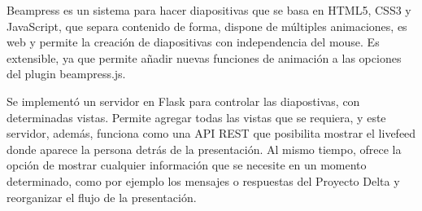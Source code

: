 
\begin{conclusions}

	Beampress es un sistema para hacer diapositivas que se basa en HTML5, CSS3 y JavaScript, que separa contenido de forma, dispone de múltiples animaciones, es web y permite la creación de diapositivas con independencia del mouse. Es extensible, ya que permite añadir nuevas funciones de animación a las opciones del plugin beampress.js.

	Se implementó un servidor en Flask para controlar las diapostivas, con determinadas vistas. Permite agregar todas las vistas que se requiera, y este servidor, además, funciona como una API REST que posibilita mostrar el livefeed donde aparece la persona detrás de la presentación. Al mismo tiempo, ofrece la opción de mostrar cualquier información que se necesite en un momento determinado, como por ejemplo los mensajes o respuestas del Proyecto Delta y reorganizar el flujo de la presentación.

\end{conclusions}
